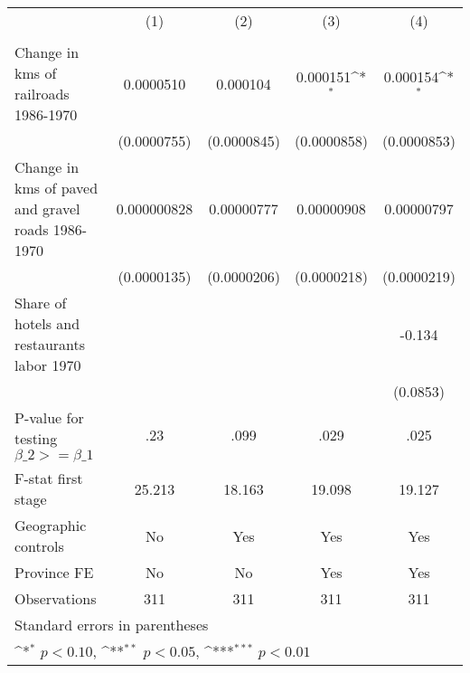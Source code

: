 {
\def\sym#1{\ifmmode^{#1}\else\(^{#1}\)\fi}
\begin{tabular}{l*{4}{c}}
\hline\hline
                &\multicolumn{1}{c}{(1)}&\multicolumn{1}{c}{(2)}&\multicolumn{1}{c}{(3)}&\multicolumn{1}{c}{(4)}\\
                &\multicolumn{1}{c}{}&\multicolumn{1}{c}{}&\multicolumn{1}{c}{}&\multicolumn{1}{c}{}\\
\hline
Change in kms of railroads 1986-1970&0.0000510         & 0.000104         & 0.000151\sym{*}  & 0.000154\sym{*}  \\
                &(0.0000755)         &(0.0000845)         &(0.0000858)         &(0.0000853)         \\
[1em]
Change in kms of paved and gravel roads 1986-1970&0.000000828         &0.00000777         &0.00000908         &0.00000797         \\
                &(0.0000135)         &(0.0000206)         &(0.0000218)         &(0.0000219)         \\
[1em]
Share of hotels and restaurants labor 1970&                  &                  &                  &   -0.134         \\
                &                  &                  &                  & (0.0853)         \\
\hline
P-value for testing $\beta\_{2} >= \beta\_{1}$&      .23         &     .099         &     .029         &     .025         \\
F-stat first stage&   25.213         &   18.163         &   19.098         &   19.127         \\
Geographic controls&       No         &      Yes         &      Yes         &      Yes         \\
Province FE     &       No         &       No         &      Yes         &      Yes         \\
Observations    &      311         &      311         &      311         &      311         \\
\hline\hline
\multicolumn{5}{l}{\footnotesize Standard errors in parentheses}\\
\multicolumn{5}{l}{\footnotesize \sym{*} \(p<0.10\), \sym{**} \(p<0.05\), \sym{***} \(p<0.01\)}\\
\end{tabular}
}
